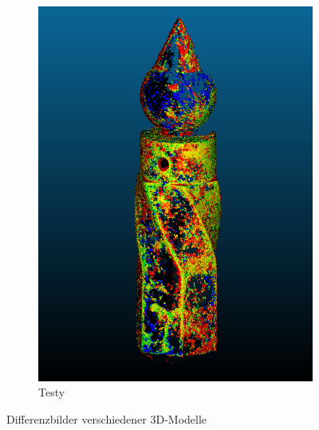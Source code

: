 \documentclass[./00PhotoBox.tex]{subfiles}
\begin{document}
\begin{figure}
\begin{subfigure}{0.27\textwidth}
        \includegraphics[width=1\textwidth]{img/7_versuche/testy_diff.png}
        \caption{Testy}
        \label{img:differenz_testy}
    \end{subfigure}
    \caption{Differenzbilder verschiedener 3D-Modelle}
    \label{img:differenz}
\end{figure}
\end{document}
